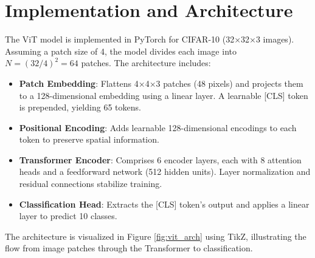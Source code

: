 \documentclass{article}
\begin{document}
\section{Implementation and Architecture}
The ViT model is implemented in PyTorch for CIFAR-10 (32×32×3 images). Assuming a patch size of 4, the model divides each image into \( N = (32/4)^2 = 64 \) patches. The architecture includes:

\begin{itemize}
    \item \textbf{Patch Embedding}: Flattens 4×4×3 patches (48 pixels) and projects them to a 128-dimensional embedding using a linear layer. A learnable [CLS] token is prepended, yielding 65 tokens.
    \item \textbf{Positional Encoding}: Adds learnable 128-dimensional encodings to each token to preserve spatial information.
    \item \textbf{Transformer Encoder}: Comprises 6 encoder layers, each with 8 attention heads and a feedforward network (512 hidden units). Layer normalization and residual connections stabilize training.
    \item \textbf{Classification Head}: Extracts the [CLS] token’s output and applies a linear layer to predict 10 classes.
\end{itemize}

The architecture is visualized in Figure \ref{fig:vit_arch} using TikZ, illustrating the flow from image patches through the Transformer to classification.
\end{document}
